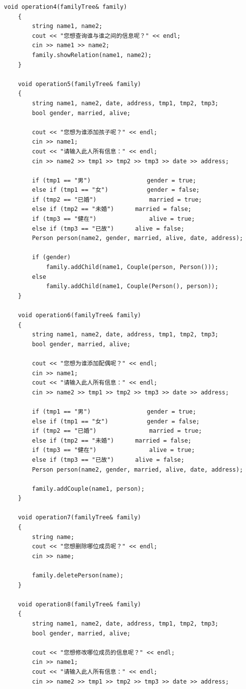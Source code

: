 \documentclass[a4paper,11pt,UTF8]{ctexart}
\begin{document}
\begin{lstlisting}[caption=familytree.cpp,captionpos=b]
    void operation4(familyTree& family)
    {
        string name1, name2;
        cout << "您想查询谁与谁之间的信息呢？" << endl;
        cin >> name1 >> name2;
        family.showRelation(name1, name2);
    }

    void operation5(familyTree& family)
    {
        string name1, name2, date, address, tmp1, tmp2, tmp3;
        bool gender, married, alive;

        cout << "您想为谁添加孩子呢？" << endl;
        cin >> name1;
        cout << "请输入此人所有信息：" << endl;
        cin >> name2 >> tmp1 >> tmp2 >> tmp3 >> date >> address;

        if (tmp1 == "男")				gender = true;
        else if (tmp1 == "女")			gender = false;
        if (tmp2 == "已婚")				married = true;
        else if (tmp2 == "未婚")		married = false;
        if (tmp3 == "健在")				alive = true;
        else if (tmp3 == "已故")		alive = false;
        Person person(name2, gender, married, alive, date, address);

        if (gender)
            family.addChild(name1, Couple(person, Person()));
        else
            family.addChild(name1, Couple(Person(), person));
    }

    void operation6(familyTree& family)
    {
        string name1, name2, date, address, tmp1, tmp2, tmp3;
        bool gender, married, alive;

        cout << "您想为谁添加配偶呢？" << endl;
        cin >> name1;
        cout << "请输入此人所有信息：" << endl;
        cin >> name2 >> tmp1 >> tmp2 >> tmp3 >> date >> address;

        if (tmp1 == "男")				gender = true;
        else if (tmp1 == "女")			gender = false;
        if (tmp2 == "已婚")				married = true;
        else if (tmp2 == "未婚")		married = false;
        if (tmp3 == "健在")				alive = true;
        else if (tmp3 == "已故")		alive = false;
        Person person(name2, gender, married, alive, date, address);

        family.addCouple(name1, person);
    }

    void operation7(familyTree& family)
    {
        string name;
        cout << "您想删除哪位成员呢？" << endl;
        cin >> name;

        family.deletePerson(name);
    }

    void operation8(familyTree& family)
    {
        string name1, name2, date, address, tmp1, tmp2, tmp3;
        bool gender, married, alive;

        cout << "您想修改哪位成员的信息呢？" << endl;
        cin >> name1;
        cout << "请输入此人所有信息：" << endl;
        cin >> name2 >> tmp1 >> tmp2 >> tmp3 >> date >> address;


\end{lstlisting}
\end{document}
